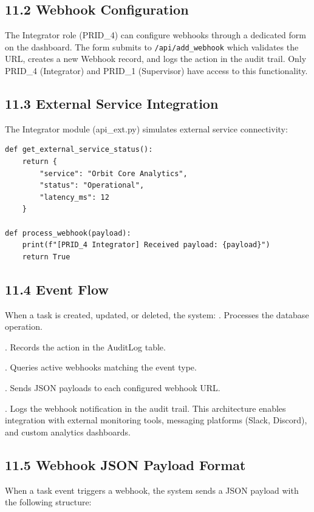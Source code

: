 ﻿\documentclass[12pt]{article}
\begin{document}
\subsection*{11.2 Webhook Configuration}
The Integrator role (PRID\_4) can configure webhooks through a dedicated form on the dashboard. The form submits to \texttt{/api/add\_webhook} which validates the URL, creates a new Webhook record, and logs the action in the audit trail. Only PRID\_4 (Integrator) and PRID\_1 (Supervisor) have access to this functionality.

\subsection*{11.3 External Service Integration}
The Integrator module (api\_ext.py) simulates external service connectivity:

\begin{lstlisting}[style=pycode]
def get_external_service_status():
    return {
        "service": "Orbit Core Analytics",
        "status": "Operational",
        "latency_ms": 12
    }

def process_webhook(payload):
    print(f"[PRID_4 Integrator] Received payload: {payload}")
    return True
\end{lstlisting}

\subsection*{11.4 Event Flow}
When a task is created, updated, or deleted, the system:\medbreak
{}. Processes the database operation.\par
{}. Records the action in the AuditLog table.\par
{}. Queries active webhooks matching the event type.\par
{}. Sends JSON payloads to each configured webhook URL.\par
{}. Logs the webhook notification in the audit trail.
\medbreak
\noindent This architecture enables integration with external monitoring tools, messaging platforms (Slack, Discord), and custom analytics dashboards.

\subsection*{11.5 Webhook JSON Payload Format}
When a task event triggers a webhook, the system sends a JSON payload with the following structure:
\end{document}
